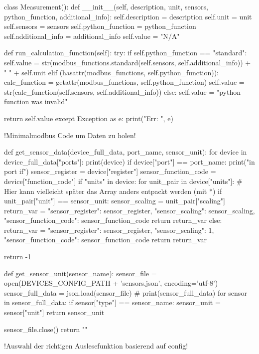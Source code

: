 \begin{pythoncode}
class Measurement():
	def __init__(self, description, unit, sensors, python_function, additional_info):
	self.description = description
	self.unit = unit
	self.sensors = sensors
	self.python_function = python_function
	self.additional_info = additional_info
	self.value = "N/A"
	
	def run_calculation_function(self):
		try:
			if self.python_function == "standard":
				self.value = str(modbus_functions.standard(self.sensors, self.additional_info)) + " " + self.unit
			elif (hasattr(modbus_functions, self.python_function)):
				calc_function = getattr(modbus_functions, self.python_function)
				self.value = str(calc_function(self.sensors, self.additional_info))
			else:
				self.value = "python function was invalid"
			
			return self.value
		except Exception as e:
			print("Err: ", e)
\end{pythoncode}

!Minimalmodbus Code um Daten zu holen!

\begin{pythoncode}	
def get_sensor_data(device_full_data, port_name, sensor_unit):
	for device in device_full_data["ports"]:
	print(device)
	if device["port"] == port_name:
	print("in port if")
	sensor_register = device["register"]
	sensor_function_code = device["function_code"]
	if "units" in device:
	for unit_pair in device["units"]:  # Hier kann vielleicht später das Array anders entpackt werden (mit *)
	if unit_pair["unit"] == sensor_unit:
	sensor_scaling = unit_pair["scaling"]
	return_var = {"sensor_register": sensor_register, "sensor_scaling": sensor_scaling,
		"sensor_function_code": sensor_function_code}
	return return_var
	else:
	return_var = {"sensor_register": sensor_register, "sensor_scaling": 1,
		"sensor_function_code": sensor_function_code}
	return return_var
	
	
	return -1


def get_sensor_unit(sensor_name):
	sensor_file = open(DEVICES_CONFIG_PATH + 'sensors.json', encoding='utf-8')
	sensor_full_data = json.load(sensor_file)
	# print(sensor_full_data)
	for sensor in sensor_full_data:
	if sensor["type"] == sensor_name:
	sensor_unit = sensor["unit"]
	return sensor_unit

	sensor_file.close()
	return ""
\end{pythoncode}

!Auswahl der richtigen Auslesefunktion basierend auf config!
